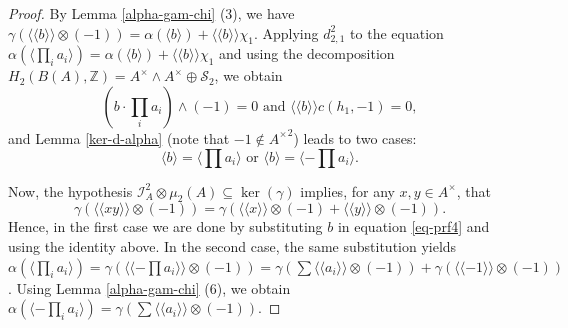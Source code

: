 \documentclass[11pt]{amsart}
\theoremstyle{definition}
\theoremstyle{plain}
\numberwithin{equation}{section}
\newcommand{\z}{\mathbb{Z}}
\newcommand{\II}{\mathcal{I}}
\renewcommand{\SS}{\mathcal{S}}
\renewcommand{\aa}{{A^\times}}
\newcommand{\lan}{\langle}
\newcommand{\ran}{\rangle}
\newcommand{\Lan}{\langle \! \langle}
\newcommand{\Ran}{\rangle \! \rangle}
\begin{document}
\begin{proof}
    By Lemma \ref{alpha-gam-chi} (3), we have $\gamma(\Lan b\Ran\otimes(-1))=\alpha(\lan b\ran)+\Lan b\Ran\chi_1$. Applying $d^2_{2,1}$ to the equation $\alpha(\lan\prod_{i}a_i\ran)=\alpha(\lan b\ran)+\Lan b\Ran\chi_1$ and using the decomposition $H_2(B(A),\z)=\aa\wedge\aa\oplus \SS_2$, we obtain
    \[
        (b\cdot\prod_ia_i)\wedge (-1)=0 \text{ and } \Lan b\Ran c(h_1,-1)=0,
    \]
    and Lemma \ref{ker-d-alpha} (note that $-1\notin\aa^2$) leads to two cases:
    \[
        \lan b\ran=\lan\prod a_i\ran\text{ or } \lan b\ran=\lan-\prod a_i\ran.
    \]
    
    Now, the hypothesis $\II_A^2\otimes\mu_2(A)\subseteq\ker(\gamma)$ implies, for any $x,y\in\aa$, that
    \[
        \gamma(\Lan xy\Ran\otimes(-1))=\gamma(\Lan x\Ran\otimes(-1)+\Lan y\Ran\otimes(-1)).
    \]
    Hence, in the first case we are done by substituting $b$ in equation \eqref{eq-prf4} and using the identity above. In the second case, the same substitution yields $\alpha(\lan\prod_{i}a_i\ran)=\gamma(\Lan -\prod a_i\Ran\otimes(-1))=\gamma(\sum\Lan a_i\Ran\otimes(-1))+\gamma(\Lan -1\Ran\otimes(-1))$. Using Lemma \ref{alpha-gam-chi} (6), we obtain $\alpha(\lan-\prod_{i}a_i\ran)=\gamma(\sum\Lan a_i\Ran\otimes(-1))$. 
\end{proof}
\end{document}
